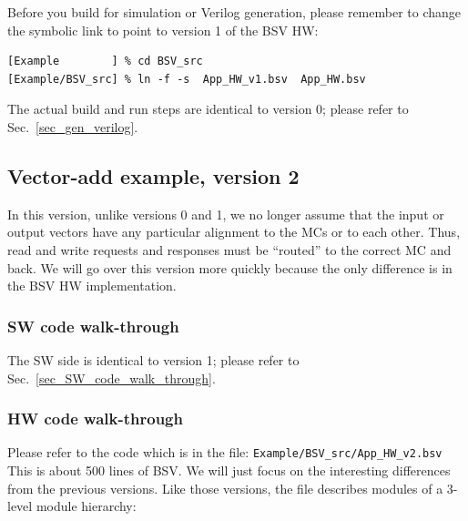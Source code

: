 \documentclass[twoside,letterpaper,11pt]{article}
\newcommand{\hm}{\hspace*{1em}}
\begin{document}
Before you build for simulation or Verilog generation, please remember
to change the symbolic link to point to version 1 of the BSV HW:

\begin{Verbatim}[frame=single, label=Properly named App\_HW.bsv application source file] 
[Example        ] % cd BSV_src
[Example/BSV_src] % ln -f -s  App_HW_v1.bsv  App_HW.bsv
\end{Verbatim}

The actual build and run steps are identical to version 0; please
refer to Sec.~\ref{sec_gen_verilog}.


\subsection{Vector-add example, version 2}

\label{sec_vadd_v2}

In this version, unlike versions 0 and 1, we no longer assume that the
input or output vectors have any particular alignment to the MCs or to
each other.  Thus, read and write requests and responses must be
``routed'' to the correct MC and back.  We will go over this version
more quickly because the only difference is in the BSV HW
implementation.


\subsubsection{SW code walk-through}

The SW side is identical to version 1; please refer to
Sec.~\ref{sec_SW_code_walk_through}.


\subsubsection{HW code walk-through}

Please refer to the code which is in the file: \hm
\verb|Example/BSV_src/App_HW_v2.bsv| \\ This is about 500 lines of
BSV. We will just focus on the interesting differences from the
previous versions.  Like those versions, the file describes modules of
a 3-level module hierarchy:
\end{document}
